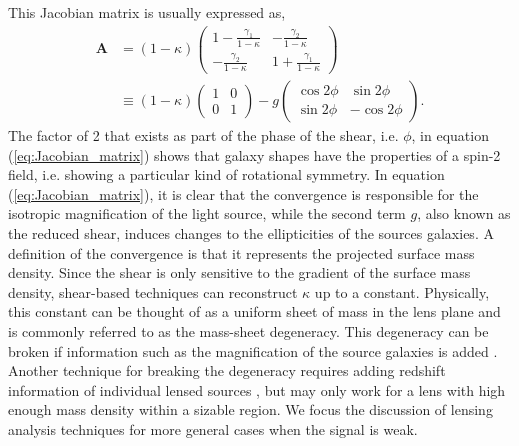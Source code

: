 This Jacobian matrix is usually expressed as,  
\begin{align}
\mathbf{A} &= (1 - \kappa)\left(
\begin{array}{cc}
1 - \frac{\gamma_1}{1 - \kappa} & - \frac{\gamma_2}{1 - \kappa} \\
- \frac{\gamma_2}{1 - \kappa} & 1 + \frac{\gamma_1}{1 - \kappa}
\end{array} 
\right) \\
& \equiv (1 - \kappa)\left(
\begin{array}{cc}
1 & 0 \\
0 & 1 
\end{array}
\right)
-
g \left(
\begin{array}{cc}
\cos 2\phi & \sin 2\phi\\
\sin 2\phi & -\cos 2\phi
\end{array}
\right). \label{eq:Jacobian_matrix}
\end{align}
The factor of 2 that exists as part of the phase of the shear, i.e. $\phi$, in
equation (\ref{eq:Jacobian_matrix}) shows 
that galaxy shapes have the properties of a spin-2 field, i.e. showing
a particular kind of rotational symmetry.  In equation 
(\ref{eq:Jacobian_matrix}), it is clear that the convergence is 
responsible for the
isotropic magnification of the light source, while the second term $g$, also
known as the reduced shear, induces changes to the ellipticities of the sources
galaxies. A definition of the convergence is that it
represents the projected surface mass density.
Since the shear is only sensitive to the gradient of the surface
mass density, shear-based techniques can reconstruct $\kappa$ up to a constant.
Physically, this constant can be thought of as a uniform sheet 
of mass in the lens plane and is commonly referred to as the mass-sheet
degeneracy. This degeneracy can be broken if information such as the 
magnification of the
source galaxies is added \citep{Narayan1996}. Another technique for breaking the 
degeneracy requires adding redshift information of individual lensed sources
\citep{Bradac2004}, but may only work for a lens with high enough mass density
within a sizable region. We focus the discussion of lensing analysis techniques
for more general cases when the signal is weak.

